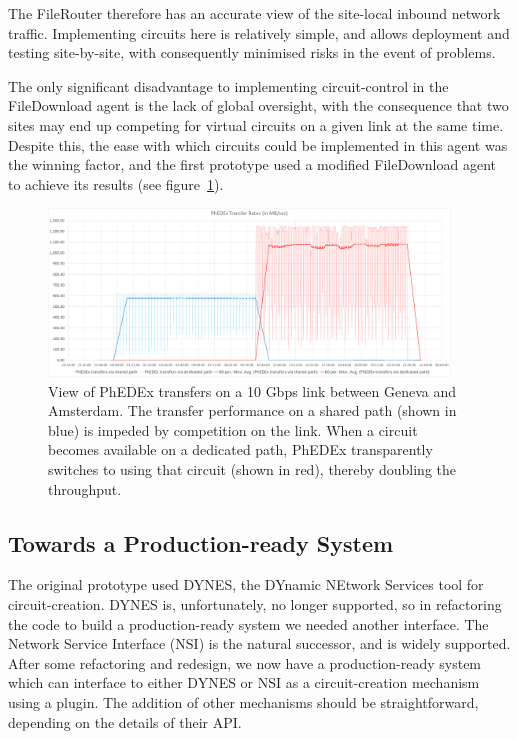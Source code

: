The FileRouter therefore has an accurate view of the site-local inbound network traffic. Implementing circuits here is relatively simple, and allows deployment and testing site-by-site, with consequently minimised risks in the event of problems.

The only significant disadvantage to implementing circuit-control in the FileDownload agent is the lack of global oversight, with the consequence that two sites may end up competing for virtual circuits on a given link at the same time. Despite this, the ease with which circuits could be implemented in this agent was the winning factor, and the first prototype used a modified FileDownload agent to achieve its results (see figure~\ref{fig:combined_phedex_transfers}).

\begin{figure}[h]
  \centering
  \includegraphics[width=0.95\textwidth]{figure-FileDownload_All_paths}
  \caption{View of PhEDEx transfers on a 10 Gbps link between Geneva and Amsterdam. The transfer performance on a shared path (shown in blue) is impeded by competition on the link. When a circuit becomes available on a dedicated path, PhEDEx transparently switches to using that circuit (shown in red), thereby doubling the throughput.}
  \label{fig:combined_phedex_transfers}
\end{figure}

\subsection{Towards a Production-ready System}

The original prototype used DYNES\cite{DYNES}, the DYnamic NEtwork Services tool for circuit-creation. DYNES is, unfortunately, no longer supported, so in refactoring the code to build a production-ready system we needed another interface. The Network Service Interface (NSI\cite{NSI}) is the natural successor, and is widely supported. After some refactoring and redesign, we now have a production-ready system which can interface to either DYNES or NSI as a circuit-creation mechanism using a plugin. The addition of other mechanisms should be straightforward, depending on the details of their API.